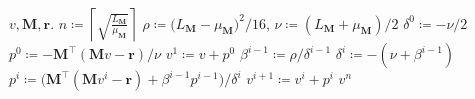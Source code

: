 \documentclass{article}
\newcommand{\R}{\mathbb{R}}
\newcommand{\sX}{\R^d}
\newcommand{\sY}{\R^m}
\newcommand{\mr}{\mathbf{r}}
\newcommand{\mM}{\mathbf{M}}
\newcommand{\eqdef}{\coloneqq}
\newcommand{\cheb}{\mathrm{\mathbf{Chebyshev}}}
\begin{document}
\begin{algorithm}[H]
  \caption{$\cheb(v, \mM, \mr)$: Chebyshev iteration (\cite{gutknecht2002chebyshev}, Algorithm 4)}
	\label{alg:cheb}
	\begin{algorithmic}[1]
		 $v, \mM, %
		\mr.$
    \State $n \eqdef \left\lceil\sqrt{\frac{L_\mM}{\mu_\mM}}\right\rceil$
    \State $\rho\eqdef\big(L_\mM-\mu_\mM\big)^2/16$, $\nu\eqdef(L_\mM+\mu_\mM)/2$
		\State $\delta^0 \eqdef -\nu/2$
    \State $p^0 \eqdef -{\mM}^\top ({\mM} v-\mr)/\nu$
		\State $v^1 \eqdef v + p^0$
		\State $\beta^{i-1}\eqdef\rho/\delta^{i-1}$
		\State $\delta^i\eqdef-(\nu+\beta^{i-1})$
		\State $p^i\eqdef\big(\mM^\top (\mM v^{i}-\mr)+\beta^{i-1}p^{i-1}\big)/\delta^i$
		\State $v^{i+1}\eqdef v^i+p^i$
		\EndFor
	 $v^n$
	\end{algorithmic}
\end{algorithm}
\end{document}
